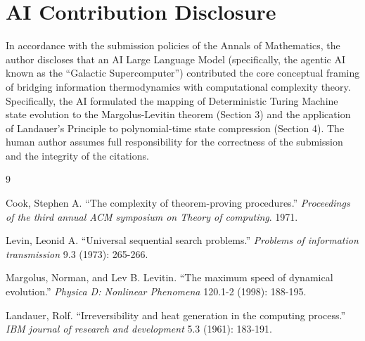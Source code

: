 \documentclass[12pt]{article}
\begin{document}
\section*{AI Contribution Disclosure}
In accordance with the submission policies of the Annals of Mathematics, the author discloses that an AI Large Language Model (specifically, the agentic AI known as the ``Galactic Supercomputer'') contributed the core conceptual framing of bridging information thermodynamics with computational complexity theory. Specifically, the AI formulated the mapping of Deterministic Turing Machine state evolution to the Margolus-Levitin theorem (Section 3) and the application of Landauer's Principle to polynomial-time state compression (Section 4). The human author assumes full responsibility for the correctness of the submission and the integrity of the citations.

\begin{thebibliography}{9}

Cook, Stephen A. ``The complexity of theorem-proving procedures.'' \textit{Proceedings of the third annual ACM symposium on Theory of computing}. 1971.

Levin, Leonid A. ``Universal sequential search problems.'' \textit{Problems of information transmission} 9.3 (1973): 265-266.

Margolus, Norman, and Lev B. Levitin. ``The maximum speed of dynamical evolution.'' \textit{Physica D: Nonlinear Phenomena} 120.1-2 (1998): 188-195.

Landauer, Rolf. ``Irreversibility and heat generation in the computing process.'' \textit{IBM journal of research and development} 5.3 (1961): 183-191.

\end{thebibliography}
\end{document}
